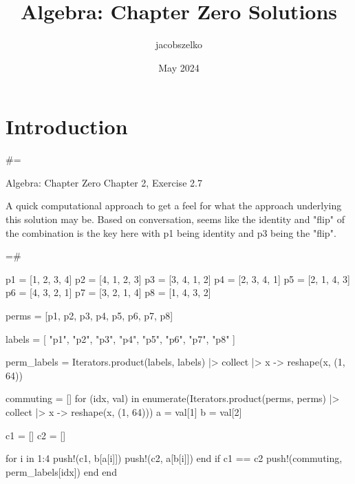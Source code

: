 \documentclass{article}
\title{Algebra: Chapter Zero Solutions}
\author{jacobszelko }
\date{May 2024}
\begin{document}
\maketitle

\section{Introduction}

#=

Algebra: Chapter Zero Chapter 2, Exercise 2.7

A quick computational approach to get a feel for what the approach underlying this solution may be.
Based on conversation, seems like the identity and "flip" of the combination is the key here with p1 being identity and p3 being the "flip".

=#

p1 = [1, 2, 3, 4]
p2 = [4, 1, 2, 3]
p3 = [3, 4, 1, 2]
p4 = [2, 3, 4, 1]
p5 = [2, 1, 4, 3]
p6 = [4, 3, 2, 1]
p7 = [3, 2, 1, 4]
p8 = [1, 4, 3, 2]

perms = [p1, p2, p3, p4, p5, p6, p7, p8]

labels = [
    "p1",
    "p2",
    "p3",
    "p4",
    "p5",
    "p6",
    "p7",
    "p8"
]

perm_labels = Iterators.product(labels, labels) |> collect |> x -> reshape(x, (1, 64))

commuting = []
for (idx, val) in enumerate(Iterators.product(perms, perms) |> collect |> x -> reshape(x, (1, 64)))
    a = val[1]
    b = val[2]

    c1 = []
    c2 = []

    for i in 1:4
        push!(c1, b[a[i]])
        push!(c2, a[b[i]])
    end
    if c1 == c2
        push!(commuting, perm_labels[idx])
    end
end
\end{document}
